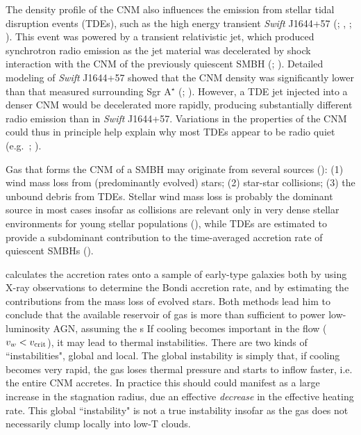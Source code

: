 \documentclass[usenatbib,fleqn]{mn2e}
\begin{document}
The density profile of the CNM also influences the emission from
stellar tidal disruption events (TDEs), such as the high energy
transient {\it Swift} J1644+57 (\citealt{Levan+11};
\citealt{Bloom+11}, \citealt{Burrows+11}; \citealt{Zauderer+11}).
This event was powered by a transient relativistic jet, which produced
synchrotron radio emission as the jet material was decelerated by
shock interaction with the CNM of the previously quiescent SMBH
(\citealt{Giannios&Metzger11}; \citealt{Zauderer+11}).  Detailed
modeling of {\it Swift} J1644+57 showed that the CNM density was
significantly lower than that measured surrounding Sgr A$^{\star}$
(\citealt{Metzger+12}; \citealt{Berger+12}).  However, a TDE jet
injected into a denser CNM would be decelerated more rapidly,
producing substantially different radio emission than in {\it Swift}
J1644+57.  Variations in the properties of the CNM could thus in
principle help explain why most TDEs appear to be radio quiet
(e.g.~\citealt{Bower+13}; \citealt{VanVelzen+13}).

Gas that forms the CNM of a SMBH may originate from several sources
(\citealt{Ho:2009a}): (1) wind mass loss from (predominantly evolved)
stars; (2) star-star collisions; (3) the unbound debris from TDEs.
Stellar wind mass loss is probably the dominant source in most cases
insofar as collisions are relevant only in very dense stellar
environments for young stellar populations (\citealt{Rubin&Loeb11}),
while TDEs are estimated to provide a subdominant contribution to the
time-averaged accretion rate of quiescent SMBHs
(\citealt{MacLeod+13}).

\citet{Ho:2009a} calculates the accretion rates onto a sample of
early-type galaxies both by using X-ray observations to determine the
Bondi accretion rate, and by estimating the contributions from the
mass loss of evolved stars.  Both methods lead him to conclude that
the available reservoir of gas is more than sufficient to power
low-luminosity AGN, assuming the s
If cooling becomes important in the flow ($v_{w} < v_{\rm crit}$), it may lead to thermal instabilities.  There are two kinds of ``instabilities", global and local.  The global instability is simply that, if cooling becomes very rapid, the gas loses thermal pressure and starts to inflow faster, i.e. the entire CNM accretes.  In
practice this should could manifest as a large increase in the stagnation radius, due an effective {\it decrease} in the effective heating rate.  This global ``instability" is not a true instability insofar as the gas does not necessarily clump locally into low-T clouds.
\end{document}
